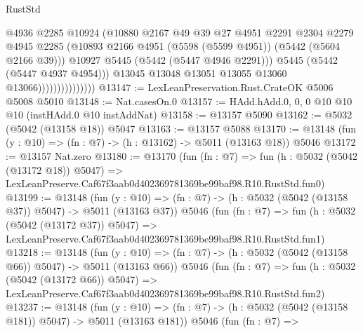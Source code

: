 \begin{lexlean}{RustStd}
\begin{coremodule}
                                    @4936
                                    @2285
                                    @10924
                                    (@10880
                                      @2167
                                      @49
                                      @39
                                      @27
                                      @4951
                                      @2291
                                      @2304
                                      @2279
                                      @4945
                                      @2285
                                      (@10893
                                        @2166
                                        @4951
                                        (@5598 (@5599 @4951))
                                        (@5442 (@5604 @2166 @39)))
                                      @10927
                                      @5445
                                      (@5442 (@5447 @4946 @2291)))
                                    @5445
                                    (@5442 (@5447 @4937 @4954)))
                                  @13045
                                  @13048
                                  @13051
                                  @13055
                                  @13060
                                  @13066)))))))))))))))
@13147 := LexLeanPreservation.Rust.CrateOK @5006 @5008 @5010
@13148 := Nat.casesOn.{0}
@13157 := HAdd.hAdd.{0, 0, 0} @10 @10 @10 (instHAdd.{0} @10 instAddNat)
@13158 := @13157 @5090
@13162 := @5032 (@5042 (@13158 @18)) @5047
@13163 := @13157 @5088
@13170 := @13148 (fun (y : @10) => (fn : @7) -> (h : @13162) -> @5011 (@13163 @18)) @5046
@13172 := @13157 Nat.zero
@13180 := @13170
    (fun (fn : @7) =>
    fun (h : @5032 (@5042 (@13172 @18)) @5047) =>
    LexLeanPreserve.Caf67f3aab0d402369781369be99baf98.R10.RustStd.fun0)
@13199 := @13148
    (fun (y : @10) => (fn : @7) -> (h : @5032 (@5042 (@13158 @37)) @5047) -> @5011 (@13163 @37))
    @5046
    (fun (fn : @7) =>
    fun (h : @5032 (@5042 (@13172 @37)) @5047) =>
    LexLeanPreserve.Caf67f3aab0d402369781369be99baf98.R10.RustStd.fun1)
@13218 := @13148
    (fun (y : @10) => (fn : @7) -> (h : @5032 (@5042 (@13158 @66)) @5047) -> @5011 (@13163 @66))
    @5046
    (fun (fn : @7) =>
    fun (h : @5032 (@5042 (@13172 @66)) @5047) =>
    LexLeanPreserve.Caf67f3aab0d402369781369be99baf98.R10.RustStd.fun2)
@13237 := @13148
    (fun (y : @10) => (fn : @7) -> (h : @5032 (@5042 (@13158 @181)) @5047) -> @5011 (@13163 @181))
    @5046
    (fun (fn : @7) =>

\end{coremodule}
\end{lexlean}
